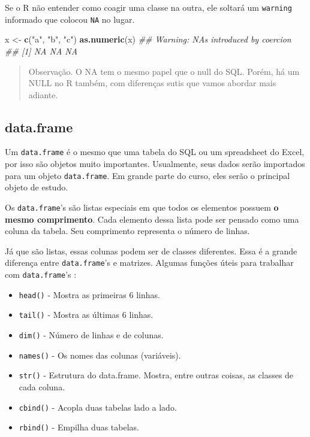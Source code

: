\documentclass[
]{book}
\newenvironment{Shaded}{\begin{snugshade}}{\end{snugshade}}
\newcommand{\CommentTok}[1]{\textcolor[rgb]{0.56,0.35,0.01}{\textit{#1}}}
\newcommand{\KeywordTok}[1]{\textcolor[rgb]{0.13,0.29,0.53}{\textbf{#1}}}
\newcommand{\NormalTok}[1]{#1}
\newcommand{\StringTok}[1]{\textcolor[rgb]{0.31,0.60,0.02}{#1}}
\providecommand{\tightlist}{%
  \setlength{\itemsep}{0pt}\setlength{\parskip}{0pt}}
\begin{document}
Se o R não entender como coagir uma classe na outra, ele soltará um \texttt{warning} informado que colocou \texttt{NA} no lugar.

\begin{Shaded}
\begin{Highlighting}[]
\NormalTok{x <-}\StringTok{ }\KeywordTok{c}\NormalTok{(}\StringTok{"a"}\NormalTok{, }\StringTok{"b"}\NormalTok{, }\StringTok{"c"}\NormalTok{)}
\KeywordTok{as.numeric}\NormalTok{(x)}
\CommentTok{## Warning: NAs introduced by coercion}
\CommentTok{## [1] NA NA NA}
\end{Highlighting}
\end{Shaded}

\begin{quote}
Observação. O NA tem o mesmo papel que o null do SQL. Porém, há um NULL no R também, com diferenças sutis que vamos abordar mais adiante.
\end{quote}

\hypertarget{data.frame}{%
\subsection{data.frame}\label{data.frame}}

Um \texttt{data.frame} é o mesmo que uma tabela do SQL ou um spreadsheet do Excel, por isso são objetos muito importantes. Usualmente, seus dados serão importados para um objeto \texttt{data.frame}. Em grande parte do curso, eles serão o principal objeto de estudo.

Os \texttt{data.frame}'s são listas especiais em que todos os elementos possuem \textbf{o mesmo comprimento}. Cada elemento dessa lista pode ser pensado como uma coluna da tabela. Seu comprimento representa o número de linhas.

Já que são listas, essas colunas podem ser de classes diferentes. Essa é a grande diferença entre \texttt{data.frame}'s e matrizes. Algumas funções úteis para trabalhar com \texttt{data.frame}'s :

\begin{itemize}
\tightlist
\item
  \texttt{head()} - Mostra as primeiras 6 linhas.
\item
  \texttt{tail()} - Mostra as últimas 6 linhas.
\item
  \texttt{dim()} - Número de linhas e de colunas.
\item
  \texttt{names()} - Os nomes das colunas (variáveis).
\item
  \texttt{str()} - Estrutura do data.frame. Mostra, entre outras coisas, as classes de cada coluna.
\item
  \texttt{cbind()} - Acopla duas tabelas lado a lado.
\item
  \texttt{rbind()} - Empilha duas tabelas.
\end{itemize}
\end{document}
